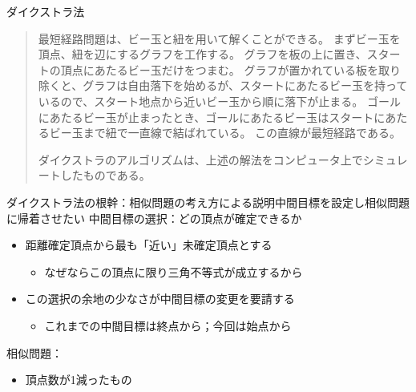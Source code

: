 \documentclass{beamer}
\begin{document}
\begin{frame}[fragile]{ダイクストラ法}{\href{https://ja.wikipedia.org/wiki/ダイクストラ法}{}}
\begin{quotation}
\fontsize{9}{12}\selectfont
最短経路問題は、ビー玉と紐を用いて解くことができる。
まずビー玉を頂点、紐を辺にするグラフを工作する。
グラフを板の上に置き、スタートの頂点にあたるビー玉だけをつまむ。
グラフが置かれている板を取り除くと、グラフは自由落下を始めるが、スタートにあたるビー玉を持っているので、スタート地点から近いビー玉から順に落下が止まる。
ゴールにあたるビー玉が止まったとき、ゴールにあたるビー玉はスタートにあたるビー玉まで紐で一直線で結ばれている。
この直線が最短経路である。

ダイクストラのアルゴリズムは、上述の解法をコンピュータ上でシミュレートしたものである。
\end{quotation}
\end{frame}

\begin{frame}[fragile]{ダイクストラ法の根幹：相似問題の考え方による説明}{中間目標を設定し相似問題に帰着させたい}
中間目標の選択：どの頂点が確定できるか
\begin{itemize}\itemsep8pt
\item 距離確定頂点から最も「近い」未確定頂点とする
\begin{itemize}%
\item なぜならこの頂点に限り三角不等式が成立するから

\begin{center}
\end{center}

\end{itemize}
\item この選択の余地の少なさが中間目標の変更を要請する
\begin{itemize}%
\item これまでの中間目標は終点から；今回は始点から
\end{itemize}
\end{itemize}

\vfill
相似問題：
\begin{itemize}\itemsep8pt
\item 頂点数が1減ったもの
\end{itemize}

\end{frame}
\end{document}
